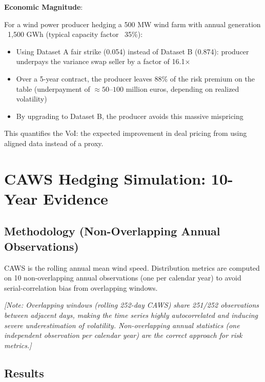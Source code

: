 \documentclass[11pt, a4paper, twoside]{article}
\begin{document}
\textbf{Economic Magnitude}:

For a wind power producer hedging a 500 MW wind farm with annual generation ~1,500 GWh (typical capacity factor ~35\%):

\begin{itemize}
\item Using Dataset A fair strike (0.054) instead of Dataset B (0.874): producer underpays the variance swap seller by a factor of 16.1×
\item Over a 5-year contract, the producer leaves 88\% of the risk premium on the table (underpayment of $\approx 50$--$100$ million euros, depending on realized volatility)
\item By upgrading to Dataset B, the producer avoids this massive mispricing
\end{itemize}

This quantifies the VoI: the expected improvement in deal pricing from using aligned data instead of a proxy.

\section{CAWS Hedging Simulation: 10-Year Evidence}

\subsection{Methodology (Non-Overlapping Annual Observations)}

CAWS is the rolling annual mean wind speed. Distribution metrics are computed on 10 non-overlapping annual observations (one per calendar year) to avoid serial-correlation bias from overlapping windows.

\textit{[Note: Overlapping windows (rolling 252-day CAWS) share 251/252 observations between adjacent days, making the time series highly autocorrelated and inducing severe underestimation of volatility. Non-overlapping annual statistics (one independent observation per calendar year) are the correct approach for risk metrics.]}

\subsection{Results}
\end{document}
